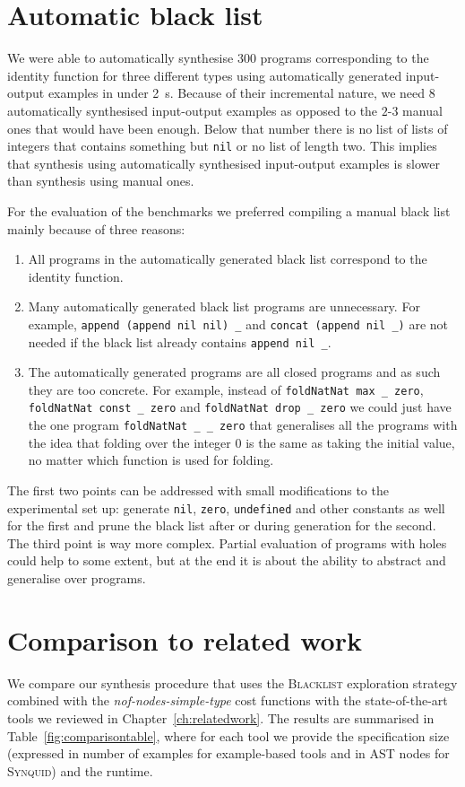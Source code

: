 \section{Automatic black list}\label{Automatic black list}
We were able to automatically synthesise $300$ programs corresponding to the identity function for three different types using automatically generated input-output examples in under \SI{2}{s}. Because of their incremental nature, we need $8$ automatically synthesised input-output examples as opposed to the $2$-$3$ manual ones that would have been enough. Below that number there is no list of lists of integers that contains something but \lstinline?nil? or no list of length two. This implies that synthesis using automatically synthesised input-output examples is slower than synthesis using manual ones.

For the evaluation of the benchmarks we preferred compiling a manual black list mainly because of three reasons: 
\begin{enumerate}
\item All programs in the automatically generated black list correspond to the identity function.
\item Many automatically generated black list programs are unnecessary. For example, \lstinline?append (append nil nil) _? and \lstinline?concat (append nil _)? are not needed if the black list already contains \lstinline?append nil _?.
\item The automatically generated programs are all closed programs and as such they are too concrete. For example, instead of \lstinline?foldNatNat max _ zero?, \lstinline?foldNatNat const _ zero? and \lstinline?foldNatNat drop _ zero? we could just have the one program \lstinline?foldNatNat _ _ zero? that generalises all the programs with the idea that folding over the integer $0$ is the same as taking the initial value, no matter which function is used for folding.
\end{enumerate}

The first two points can be addressed with small modifications to the experimental set up: generate \lstinline?nil?, \lstinline?zero?, \lstinline?undefined? and other constants as well for the first and prune the black list after or during generation for the second.
The third point is way more complex. Partial evaluation of programs with holes could help to some extent, but at the end it is about the ability to abstract and generalise over programs.

\section{Comparison to related work}
We compare our synthesis procedure that uses the \textsc{Blacklist} exploration strategy combined with the \textit{nof-nodes-simple-type} cost functions with the state-of-the-art tools we reviewed  in Chapter~\ref{ch:relatedwork}. The results are summarised in Table~\ref{fig:comparisontable}, where for each tool we provide the specification size (expressed in number of examples for example-based tools and in AST nodes for \textsc{Synquid}) and the runtime.

